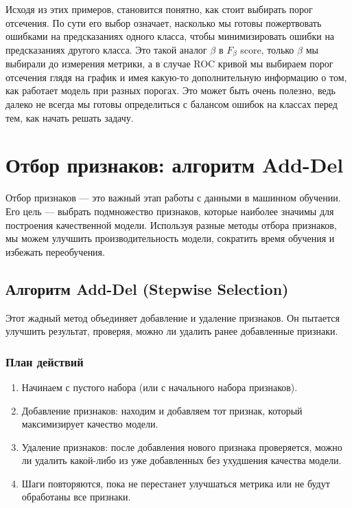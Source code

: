 Исходя из этих примеров, становится понятно, как стоит выбирать порог отсечения. По сути его выбор означает, насколько мы готовы пожертвовать ошибками на предсказаниях одного класса, чтобы минимизировать ошибки на предсказаниях другого класса.
Это такой аналог $\beta$ в $F_{\beta}$ score, только $\beta$ мы выбирали до измерения метрики, а в случае ROC кривой мы выбираем порог отсечения глядя на график и имея какую-то дополнительную информацию о том, как работает модель при разных порогах.
Это может быть очень полезно, ведь далеко не всегда мы готовы определиться с балансом ошибок на классах перед тем, как начать решать задачу.


\section*{Отбор признаков: алгоритм Add-Del}

Отбор признаков — это важный этап работы с данными в машинном обучении. Его цель — выбрать подмножество признаков, которые наиболее значимы для построения качественной модели. Используя разные методы отбора признаков, мы можем улучшить производительность модели, сократить время обучения и избежать переобучения.




\subsection*{Алгоритм Add-Del (Stepwise Selection)}

Этот жадный метод объединяет добавление и удаление признаков. Он пытается улучшить результат, проверяя, можно ли удалить ранее добавленные признаки.

\subsubsection*{План действий}

\begin{enumerate}

    \item Начинаем с пустого набора (или с начального набора признаков).

    \item Добавление признаков: находим и добавляем тот признак, который максимизирует качество модели.

    \item Удаление признаков: после добавления нового признака проверяется, можно ли удалить какой-либо из уже добавленных без ухудшения качества модели.

    \item Шаги повторяются, пока не перестанет улучшаться метрика или не будут обработаны все признаки.

\end{enumerate}


